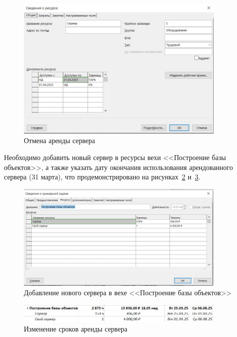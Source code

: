 \begin{figure}[H]
	\centering
	\includegraphics[width=0.9\textwidth]{img/lab4/screen23.jpg}
	\caption{Отмена аренды сервера}
	\label{fig:screen23}
\end{figure}

Необходимо добавить новый сервер в ресурсы вехи <<Построение базы объектов>>, а также указать дату окончания использования арендованного сервера (31 марта), что продемонстрировано на рисунках~\ref{fig:screen24} и~\ref{fig:screen25}.

\begin{figure}[H]
	\centering
	\includegraphics[width=0.9\textwidth]{img/lab4/screen24.jpg}
	\caption{Добавление нового сервера в вехе <<Построение базы объектов>>}
	\label{fig:screen24}
\end{figure}

\begin{figure}[H]
	\centering
	\includegraphics[width=0.9\textwidth]{img/lab4/screen25.jpg}
	\caption{Изменение сроков аренды сервера}
	\label{fig:screen25}
\end{figure}

